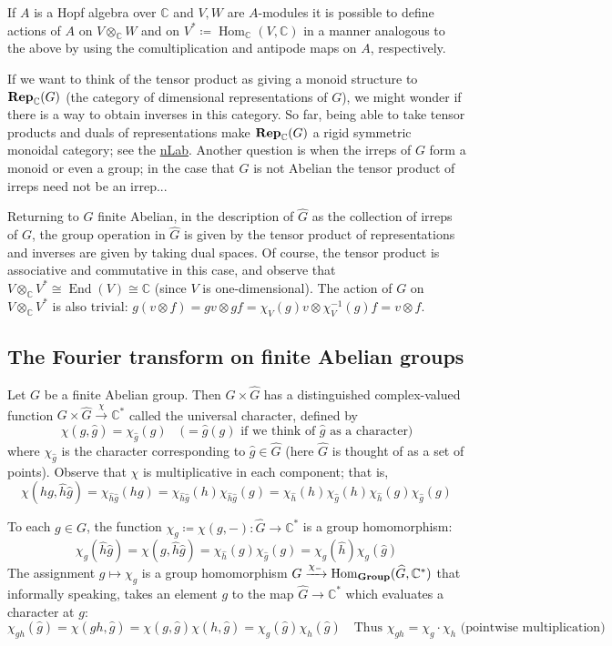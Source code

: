 \documentclass[11pt,leqno]{article}
\theoremstyle{plain}
\theoremstyle{definition}
\numberwithin{equation}{section}
\numberwithin{lem}{section}
\DeclareMathOperator{\Hom}{Hom}
\DeclareMathOperator{\End}{End}
\newcommand{\catname}[1]{{\normalfont\mathbf{#1}}}
\newcommand{\Rep}{\catname{Rep}}
\newcommand{\Group}{\catname{Group}}
\begin{document}
If $A$ is a Hopf algebra over $\mathbb C$ and $V,W$ are $A$-modules it is possible to define actions of $A$ on $V\otimes_{\mathbb C} W$ and on $V^\ast\coloneqq \Hom_{\mathbb C}(V,\mathbb C)$ in a manner analogous to the above by using the comultiplication and antipode maps on $A$, respectively.

If we want to think of the tensor product as giving a monoid structure to $\Rep_{\mathbb C}(G)$ (the category of dimensional representations of $G$), we might wonder if there is a way to obtain inverses in this category. So far, being able to take tensor products and duals of representations make $\Rep_{\mathbb C}(G)$ a rigid symmetric monoidal category; see the \href{https://ncatlab.org/nlab/show/rigid+monoidal+category}{nLab}. Another question is when the irreps of $G$ form a monoid or even a group; in the case that $G$ is not Abelian the tensor product of irreps need not be an irrep...

Returning to $G$ finite Abelian, in the description of $\widehat G$ as the collection of irreps of $G$, the group operation in $\widehat G$ is given by the tensor product of representations and inverses are given by taking dual spaces. Of course, the tensor product is associative and commutative in this case, and observe that $V\otimes_{\mathbb C}V^\ast \cong \End(V)\cong \mathbb C$ (since $V$ is one-dimensional). The action of $G$ on $V\otimes_{\mathbb C}V^\ast$ is also trivial: $g(v\otimes f) = gv\otimes gf = \chi_V(g) v\otimes \chi_V^{-1}(g)f = v\otimes f$.

\subsection{The Fourier transform on finite Abelian groups}
Let $G$ be a finite Abelian group. Then $G\times \widehat G$ has a distinguished complex-valued function $G\times \widehat G\xrightarrow{\chi}\mathbb C^\ast$ called the universal character, defined by 
\[\chi(g,\hat g) = \chi_{\hat g}(g)\quad \text{($=\hat g(g)$ if we think of $\hat g$ as a character)}\]
where $\chi_{\hat g}$ is the character corresponding to $\hat g\in \widehat G$ (here $\widehat G$ is thought of as a set of points). Observe that $\chi$ is multiplicative in each component; that is,
\[\chi(hg,\hat h\hat g) = \chi_{\hat h\hat g}(hg) = \chi_{\hat h\hat g}(h)\chi_{\hat h\hat g}(g) = \chi_{\hat h}(h)\chi_{\hat g}(h)\chi_{\hat h}(g)\chi_{\hat g}(g)\]

To each $g\in G$, the function $\chi_g\coloneqq \chi(g,-)\colon \widehat G\to\mathbb C^\ast$ is a group homomorphism: 
\[\chi_g(\hat h\hat g) = \chi(g,\hat h\hat g) = \chi_{\hat h}(g)\chi_{\hat g}(g) = \chi_g(\hat h)\chi_g(\hat g)\]
The assignment $g\mapsto \chi_g$ is a group homomorphism $G\xrightarrow{\chi_{-}} \Hom_{\Group}(\widehat G,\mathbb C^\ast)$ that informally speaking, takes an element $g$ to the map $\widehat G\to\mathbb C^\ast$ which evaluates a character at $g$:
\[\chi_{gh}(\hat g) = \chi(gh,\hat g) = \chi(g,\hat g)\chi(h,\hat g) = \chi_g(\hat g)\chi_h(\hat g)\quad \text{Thus $\chi_{gh} = \chi_g\cdot \chi_h$ (pointwise multiplication)}\]
\end{document}
